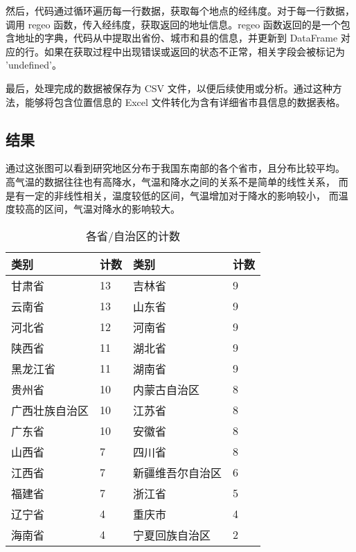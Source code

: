 \documentclass[AutoFakeBold]{LZUThesis-PgD&PhD}
\begin{document}
然后，代码通过循环遍历每一行数据，获取每个地点的经纬度。对于每一行数据，调用 regeo 函数，传入经纬度，获取返回的地址信息。regeo 函数返回的是一个包含地址的字典，代码从中提取出省份、城市和县的信息，并更新到 DataFrame 对应的行。如果在获取过程中出现错误或返回的状态不正常，相关字段会被标记为 'undefined'。

最后，处理完成的数据被保存为 CSV 文件，以便后续使用或分析。通过这种方法，能够将包含位置信息的 Excel 文件转化为含有详细省市县信息的数据表格。
   \subsection{结果}

通过这张图可以看到研究地区分布于我国东南部的各个省市，且分布比较平均。
高气温的数据往往也有高降水，气温和降水之间的关系不是简单的线性关系，
而是有一定的非线性相关，温度较低的区间，气温增加对于降水的影响较小，
而温度较高的区间，气温对降水的影响较大。

   
   \begin{table}[H]
       \centering
       \begin{tabular}{|l|l|l|l|}
           \hline
           \textbf{类别} & \textbf{计数} & \textbf{类别} & \textbf{计数} \\ \hline
           甘肃省 & 13 & 吉林省 & 9 \\ \hline
           云南省 & 13 & 山东省 & 9 \\ \hline
           河北省 & 12 & 河南省 & 9 \\ \hline
           陕西省 & 11 & 湖北省 & 9 \\ \hline
           黑龙江省 & 11 & 湖南省 & 9 \\ \hline
           贵州省 & 10 & 内蒙古自治区 & 8 \\ \hline
           广西壮族自治区 & 10 & 江苏省 & 8 \\ \hline
           广东省 & 10 & 安徽省 & 8 \\ \hline
           山西省 & 7 & 四川省 & 8 \\ \hline
           江西省 & 7 & 新疆维吾尔自治区 & 6 \\ \hline
           福建省 & 7 & 浙江省 & 5 \\ \hline
           辽宁省 & 4 & 重庆市 & 4 \\ \hline
           海南省 & 4 & 宁夏回族自治区 & 2 \\ \hline
       \end{tabular}
       \caption{各省/自治区的计数}
       \label{tab:category_count}
   \end{table}
   
\end{document}
